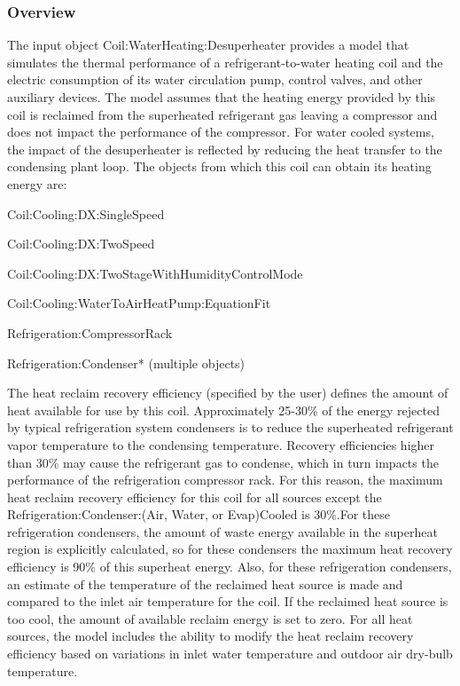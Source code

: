 \subsubsection{Overview}\label{overview-10}

The input object Coil:WaterHeating:Desuperheater provides a model that simulates the thermal performance of a refrigerant-to-water heating coil and the electric consumption of its water circulation pump, control valves, and other auxiliary devices. The model assumes that the heating energy provided by this coil is reclaimed from the superheated refrigerant gas leaving a compressor and does not impact the performance of the compressor. For water cooled systems, the impact of the desuperheater is reflected by reducing the heat transfer to the condensing plant loop. The objects from which this coil can obtain its heating energy are:

Coil:Cooling:DX:SingleSpeed

Coil:Cooling:DX:TwoSpeed

Coil:Cooling:DX:TwoStageWithHumidityControlMode

Coil:Cooling:WaterToAirHeatPump:EquationFit

Refrigeration:CompressorRack

Refrigeration:Condenser* (multiple objects)

The heat reclaim recovery efficiency (specified by the user) defines the amount of heat available for use by this coil. Approximately 25-30\% of the energy rejected by typical refrigeration system condensers is to reduce the superheated refrigerant vapor temperature to the condensing temperature. Recovery efficiencies higher than 30\% may cause the refrigerant gas to condense, which in turn impacts the performance of the refrigeration compressor rack. For this reason, the maximum heat reclaim recovery efficiency for this coil for all sources except the Refrigeration:Condenser:(Air, Water, or Evap)Cooled is 30\%.For these refrigeration condensers, the amount of waste energy available in the superheat region is explicitly calculated, so for these condensers the maximum heat recovery efficiency is 90\% of this superheat energy. Also, for these refrigeration condensers, an estimate of the temperature of the reclaimed heat source is made and compared to the inlet air temperature for the coil. If the reclaimed heat source is too cool, the amount of available reclaim energy is set to zero. For all heat sources, the model includes the ability to modify the heat reclaim recovery efficiency based on variations in inlet water temperature and outdoor air dry-bulb temperature.

